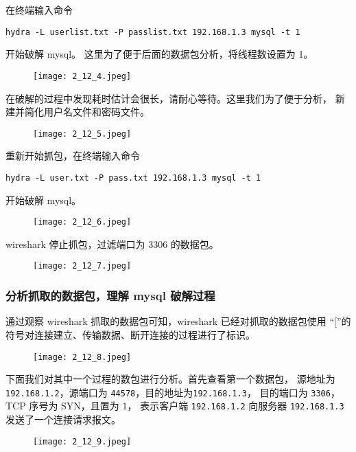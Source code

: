 在终端输入命令
\begin{verbatim}
hydra -L userlist.txt -P passlist.txt 192.168.1.3 mysql -t 1
\end{verbatim}
开始破解 mysql。
这里为了便于后面的数据包分析，将线程数设置为 1。
\begin{figure}[H]
  \begin{center}
    \texttt{[image: 2\_12\_4.jpeg]}
  \end{center}
\end{figure}

在破解的过程中发现耗时估计会很长，请耐心等待。这里我们为了便于分析，
新建并简化用户名文件和密码文件。
\begin{figure}[H]
  \begin{center}
    \texttt{[image: 2\_12\_5.jpeg]}
  \end{center}
\end{figure}

重新开始抓包，在终端输入命令
\begin{verbatim}
hydra -L user.txt -P pass.txt 192.168.1.3 mysql -t 1
\end{verbatim}
开始破解 mysql。
\begin{figure}[H]
  \begin{center}
    \texttt{[image: 2\_12\_6.jpeg]}
  \end{center}
\end{figure}

wireshark 停止抓包，过滤端口为 3306 的数据包。
\begin{figure}[H]
  \begin{center}
    \texttt{[image: 2\_12\_7.jpeg]}
  \end{center}
\end{figure}
%
\subsubsection{分析抓取的数据包，理解 mysql 破解过程}
通过观察 wireshark 抓取的数据包可知，wireshark 已经对抓取的数据包使用
``[''的符号对连接建立、传输数据、断开连接的过程进行了标识。
\begin{figure}[H]
  \begin{center}
    \texttt{[image: 2\_12\_8.jpeg]}
  \end{center}
\end{figure}

下面我们对其中一个过程的数包进行分析。首先查看第一个数据包，
源地址为 \texttt{192.168.1.2}，源端口为 \texttt{44578}，目的地址为\texttt{192.168.1.3}，
目的端口为 \texttt{3306}，TCP 序号为 SYN，且置为 $1$，
表示客户端 \texttt{192.168.1.2} 向服务器 \texttt{192.168.1.3} 发送了一个连接请求报文。
\begin{figure}[H]
  \begin{center}
    \texttt{[image: 2\_12\_9.jpeg]}
  \end{center}
\end{figure}

